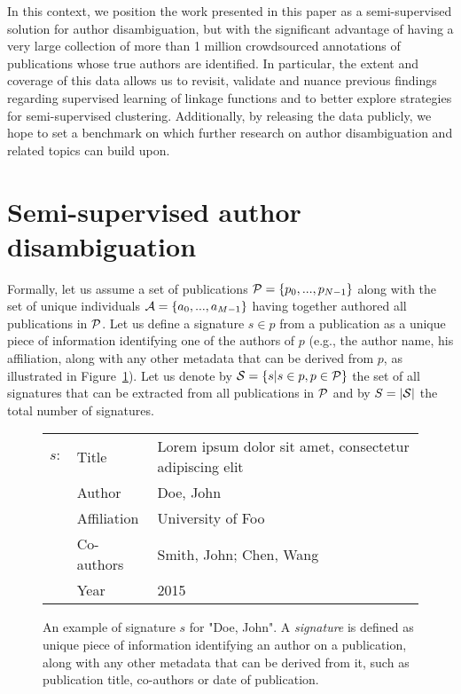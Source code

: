 \documentclass{article}
\begin{document}
In this context, we position the work presented in this paper as a
semi-supervised  solution for author disambiguation, but with the significant
advantage of having a very large collection of more than 1 million crowdsourced annotations
of publications whose true authors are identified. In particular, the extent and coverage
of this data allows us to revisit, validate and nuance previous findings regarding
supervised learning of linkage functions and to better explore strategies
for semi-supervised clustering. Additionally, by releasing the data publicly,
we hope to set a benchmark on which further research on author disambiguation
and related topics can  build upon.




\section{Semi-supervised author disambiguation}
\label{methods}

Formally, let us assume a set of publications ${\cal P} = \{ p_0, ...,
p_{N-1}\}$ along with the set of unique individuals ${\cal A} = \{ a_0, ...,
a_{M-1}\}$ having together authored all publications in ${\cal P}$.  Let us
define a signature $s \in p$ from a publication as a unique piece of
information identifying one of the authors of $p$ (e.g., the author name, his
affiliation, along with any other metadata that can be derived from $p$, as illustrated in Figure~\ref{fig:signature}). Let us
denote by ${\cal S} = \{ s | s \in p, p \in {\cal P} \}$ the set of all
signatures that can be extracted from all publications in ${\cal P}$ and
by $S=|{\cal S}|$ the total number of signatures.

\begin{figure}
\label{fig:signature}
\begin{tabular}{ l l l }
  $s:$ & Title & Lorem ipsum dolor sit amet, consectetur adipiscing elit \\
  & Author & Doe, John \\
  & Affiliation & University of Foo \\
  & Co-authors & Smith, John; Chen, Wang\\
  & Year & 2015\\
\end{tabular}

\caption{An example of signature $s$ for "Doe, John". A \textit{signature} is
defined as unique piece of information identifying an author on a publication,
along with any other metadata that can be derived from it, such as publication
title, co-authors or date of publication.}
\end{figure}
\end{document}
